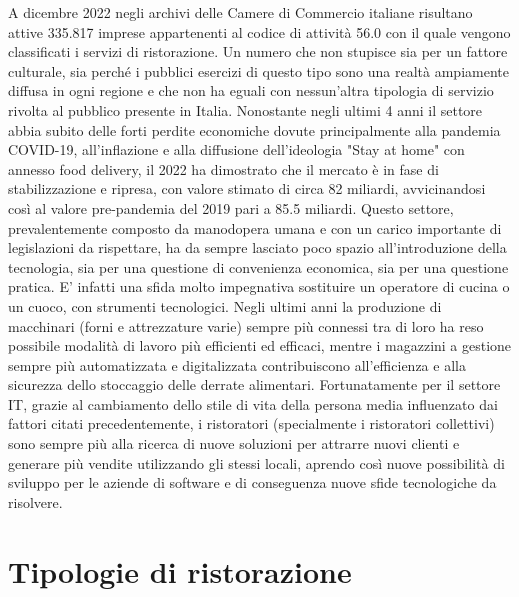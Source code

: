 \documentclass[a4paper, titlepage, 12pt, openright, oneside]{book}
\begin{document}
A dicembre 2022 negli archivi delle Camere di Commercio italiane risultano attive 335.817 
imprese appartenenti al codice di attività 56.0 con il quale vengono classificati i servizi di ristorazione.
Un numero che non stupisce sia per un fattore culturale, sia perché i pubblici esercizi di questo tipo sono
una realtà ampiamente diffusa in ogni regione e che non ha eguali con nessun'altra tipologia di servizio rivolta al pubblico presente in Italia.
\newline
Nonostante negli ultimi 4 anni il settore abbia subito delle forti perdite economiche dovute principalmente alla pandemia COVID-19,
all'inflazione e alla diffusione dell'ideologia "Stay at home" con annesso food delivery, 
il 2022 ha dimostrato che il mercato è in fase di stabilizzazione e ripresa, con valore stimato di circa 82 miliardi,
avvicinandosi così al valore pre-pandemia del 2019 pari a 85.5 miliardi. \cite{rristorazione}
\newline
Questo settore, prevalentemente composto da manodopera umana e con un carico importante di legislazioni da rispettare, ha da sempre lasciato poco spazio all’introduzione della tecnologia, sia per una questione di convenienza economica, sia per una questione pratica. E’ infatti una sfida molto impegnativa sostituire un operatore di cucina o un cuoco, con strumenti tecnologici. Negli ultimi anni la produzione di macchinari (forni e attrezzature varie) sempre più connessi tra di loro ha reso possibile modalità di lavoro più efficienti ed efficaci, mentre i magazzini a gestione sempre più automatizzata e digitalizzata contribuiscono all'efficienza e alla sicurezza dello stoccaggio delle derrate alimentari.
\newline
Fortunatamente per il settore IT, grazie al cambiamento dello stile di vita della persona media influenzato dai fattori citati precedentemente,
i ristoratori (specialmente i ristoratori collettivi) sono sempre più alla ricerca di nuove soluzioni per attrarre nuovi clienti
e generare più vendite utilizzando gli stessi locali, aprendo così nuove possibilità di sviluppo per le aziende di software e di conseguenza nuove sfide tecnologiche da risolvere.

\section{Tipologie di ristorazione}
\end{document}
